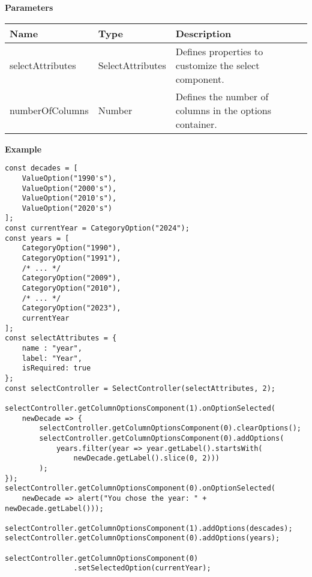\vspace*{6pt}
\noindent
\textbf{Parameters}

\begin{table}[!htb] 
    \label{api:selectControllerParameter}
    \footnotesize
    \setlength\extrarowheight{4pt}
    \begin{tabular}{ p{3.2cm} p{3cm} p{6.8cm} }
        \toprule[1.2pt]
        \textbf{Name}    & \textbf{Type}       & \textbf{Description} \\
        \midrule
        selectAttributes & SelectAttributes & Defines properties to customize the select component. \\
        numberOfColumns  & Number           & Defines the number of columns in the options container. \\
        \bottomrule[1.2pt]
    \end{tabular}
\end{table}

\vspace*{6pt}
\noindent
\textbf{Example}

\begin{lstlisting}[style = htmlcssjs, label = api:selectControllerExample]
const decades = [
    ValueOption("1990's"),
    ValueOption("2000's"),
    ValueOption("2010's"),
    ValueOption("2020's")
];
const currentYear = CategoryOption("2024");
const years = [
    CategoryOption("1990"),
    CategoryOption("1991"),
    /* ... */
    CategoryOption("2009"),
    CategoryOption("2010"),
    /* ... */
    CategoryOption("2023"),
    currentYear
];
const selectAttributes = { 
    name : "year", 
    label: "Year", 
    isRequired: true 
};
const selectController = SelectController(selectAttributes, 2);

selectController.getColumnOptionsComponent(1).onOptionSelected(
    newDecade => {
        selectController.getColumnOptionsComponent(0).clearOptions();
        selectController.getColumnOptionsComponent(0).addOptions(
            years.filter(year => year.getLabel().startsWith(
                newDecade.getLabel().slice(0, 2)))
        );
});
selectController.getColumnOptionsComponent(0).onOptionSelected(
    newDecade => alert("You chose the year: " + newDecade.getLabel()));

selectController.getColumnOptionsComponent(1).addOptions(descades);
selectController.getColumnOptionsComponent(0).addOptions(years);

selectController.getColumnOptionsComponent(0)
                .setSelectedOption(currentYear);
\end{lstlisting}